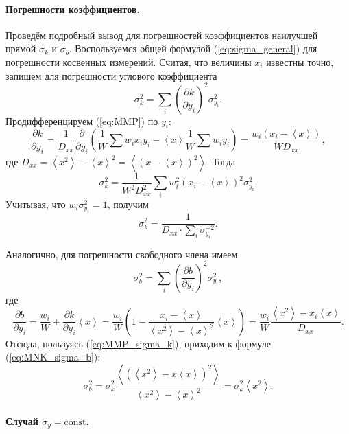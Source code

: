 \documentclass[10pt]{article}
\begin{document}
\paragraph{{\small{}Погрешности коэффициентов.}}

{\small{}Проведём подробный вывод для погрешностей коэффициентов наилучшей
прямой $\sigma_{k}$ и $\sigma_{b}$. Воспользуемся общей формулой
(\ref{eq:sigma_general}) для погрешности косвенных измерений. Считая,
что величины $x_{i}$ известны точно, запишем для погрешности углового
коэффициента
\[
\sigma_{k}^{2}=\sum\limits _{i}\left(\frac{\partial k}{\partial y_{i}}\right)^{2}\sigma_{y_{i}}^{2}.
\]
Продифференцируем (\ref{eq:MMP}) по $y_{i}$:
\[
\frac{\partial k}{\partial y_{i}}=\frac{1}{D_{xx}}\frac{\partial}{\partial y_{i}}\left(\frac{1}{W}\sum w_{i}x_{i}y_{i}-\left\langle x\right\rangle \frac{1}{W}\sum w_{i}y_{i}\right)=\frac{w_{i}\left(x_{i}-\left\langle x\right\rangle \right)}{WD_{xx}},
\]
где $D_{xx}=\left\langle x^{2}\right\rangle -\left\langle x\right\rangle ^{2}=\left\langle (x-\left\langle x\right\rangle )^{2}\right\rangle $.
Тогда
\[
\sigma_{k}^{2}=\frac{1}{W^{2}D_{xx}^{2}}\sum\limits _{i}w_{i}^{2}\left(x_{i}-\left\langle x\right\rangle \right)^{2}\sigma_{y_{i}}^{2}.
\]
Учитывая, что $w_{i}\sigma_{y_{i}}^{2}=1$, получим
\begin{equation}
\boxed{\sigma_{k}^{2}=\frac{1}{D_{xx}\cdot\sum\limits _{i}\sigma_{y_{i}}^{-2}}}.\label{eq:MMP_sigma_k}
\end{equation}
}{\small\par}

{\small{}Аналогично, для погрешности свободного члена имеем
\[
\sigma_{b}^{2}=\sum_{i}\left(\frac{\partial b}{\partial y_{i}}\right)^{2}\sigma_{y_{i}}^{2},
\]
где 
\[
\frac{\partial b}{\partial y_{i}}=\frac{w_{i}}{W}+\frac{\partial k}{\partial y_{i}}\left\langle x\right\rangle =\frac{w_{i}}{W}\left(1-\frac{x_{i}-\left\langle x\right\rangle }{\left\langle x^{2}\right\rangle -\left\langle x\right\rangle ^{2}}\left\langle x\right\rangle \right)=\frac{w_{i}}{W}\frac{\left\langle x^{2}\right\rangle -x_{i}\left\langle x\right\rangle }{D_{xx}}.
\]
Отсюда, пользуясь (\ref{eq:MMP_sigma_k}), приходим к формуле (\ref{eq:MNK_sigma_b}):
\[
\sigma_{b}^{2}=\sigma_{k}^{2}\frac{\left\langle \left(\left\langle x^{2}\right\rangle -x\left\langle x\right\rangle \right)^{2}\right\rangle }{\left\langle x^{2}\right\rangle -\left\langle x\right\rangle ^{2}}=\sigma_{k}^{2}\left\langle x^{2}\right\rangle .
\]
}{\small\par}

\paragraph{{\small{}Случай $\sigma_{y}=\mathrm{const}$.}}
\end{document}
